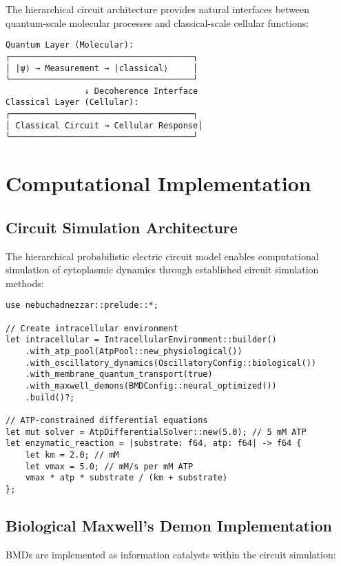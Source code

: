 \documentclass[12pt,a4paper]{article}
\begin{document}
The hierarchical circuit architecture provides natural interfaces between quantum-scale molecular processes and classical-scale cellular functions:

\begin{verbatim}
Quantum Layer (Molecular):
┌─────────────────────────────────────┐
│ |ψ⟩ → Measurement → |classical⟩     │
└─────────────────────────────────────┘
                ↓ Decoherence Interface
Classical Layer (Cellular):
┌─────────────────────────────────────┐
│ Classical Circuit → Cellular Response│
└─────────────────────────────────────┘
\end{verbatim}

\section{Computational Implementation}

\subsection{Circuit Simulation Architecture}

The hierarchical probabilistic electric circuit model enables computational simulation of cytoplasmic dynamics through established circuit simulation methods:

\begin{verbatim}
use nebuchadnezzar::prelude::*;

// Create intracellular environment
let intracellular = IntracellularEnvironment::builder()
    .with_atp_pool(AtpPool::new_physiological())
    .with_oscillatory_dynamics(OscillatoryConfig::biological())
    .with_membrane_quantum_transport(true)
    .with_maxwell_demons(BMDConfig::neural_optimized())
    .build()?;

// ATP-constrained differential equations
let mut solver = AtpDifferentialSolver::new(5.0); // 5 mM ATP
let enzymatic_reaction = |substrate: f64, atp: f64| -> f64 {
    let km = 2.0; // mM
    let vmax = 5.0; // mM/s per mM ATP
    vmax * atp * substrate / (km + substrate)
};
\end{verbatim}

\subsection{Biological Maxwell's Demon Implementation}

BMDs are implemented as information catalysts within the circuit simulation:
\end{document}
